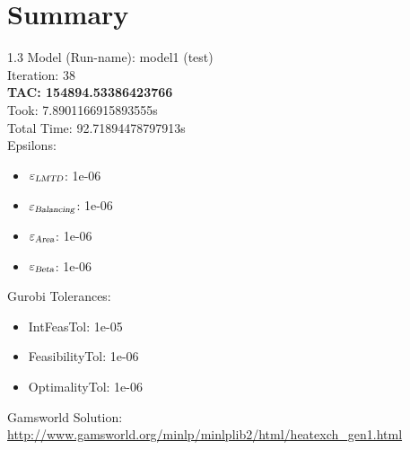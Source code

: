 \documentclass{article}%
\begin{document}
%
\normalsize%
\section{Summary}%
\thispagestyle{plain}%
\begin{spacing}{1.3}%
\Large%
Model (Run-name): model1 (test)\\%
Iteration: 38\\%
\textbf{TAC: 154894.53386423766}\\%
Took: 7.8901166915893555s\\%
Total Time: 92.71894478797913s\\%
Epsilons:%
\begin{itemize}%
	\item $\varepsilon_{\textsl{LMTD}}$: 1e-06%
	\item $\varepsilon_{\textsl{Balancing}}$: 1e-06%
	\item $\varepsilon_{\textsl{Area}}$: 1e-06%
	\item $\varepsilon_{\textsl{Beta}}$: 1e-06%
\end{itemize}%
Gurobi Tolerances:%
\begin{itemize}%
	\item IntFeasTol: 1e-05%
	\item FeasibilityTol: 1e-06%
	\item OptimalityTol: 1e-06%
\end{itemize}%
\end{spacing}%
\normalsize%
Gamsworld Solution: \url{http://www.gamsworld.org/minlp/minlplib2/html/heatexch_gen1.html}%
%
\clearpage%
\end{document}
